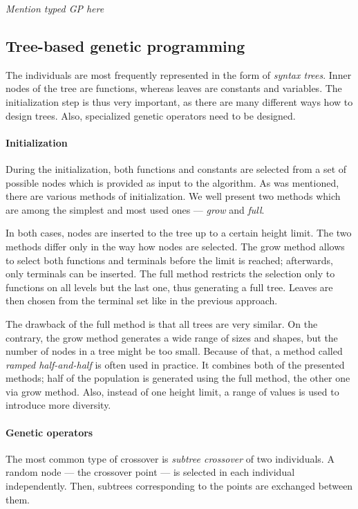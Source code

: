 \textit{Mention typed GP here}
\subsection{Tree-based genetic programming}
The individuals are most frequently represented in the form of 
\textit{syntax trees}. Inner nodes of the tree are functions, whereas leaves 
are constants and variables. The initialization step is thus very important, as
there are many different ways how to design trees. Also, specialized genetic
operators need to be designed.

\paragraph{Initialization}
During the initialization, both functions and constants are selected from a set
of possible nodes which is provided as input to the algorithm. As was mentioned,
there are various methods of initialization. We well present two methods which
are among the simplest and most used ones --- \textit{grow} and \textit{full}.

In both cases, nodes are inserted to the tree up to a certain height limit.
The two methods differ only in the way how nodes are selected. The grow method
allows to select both functions and terminals before the limit is reached;
afterwards, only terminals can be inserted. The full method restricts the
selection only to functions on all levels but the last one, thus generating 
a full tree. Leaves are then
chosen from the terminal set like in the previous approach.

The drawback of the full method is that all trees are very similar. On the
contrary, the grow method generates a wide range of sizes and shapes, but the
number of nodes in a tree might be too small. Because of that, a method called
\textit{ramped half-and-half} is often used in practice. It combines both 
of the presented methods; half of the population is generated using the full
method, the other one via grow method. Also, instead of one height limit, a
range of values is used to introduce more diversity.

\paragraph{Genetic operators}
The most common type of crossover is \textit{subtree crossover} of two
individuals. A random node --- the crossover point ---
is selected in each individual independently. Then, subtrees corresponding
to the points are exchanged between them.

